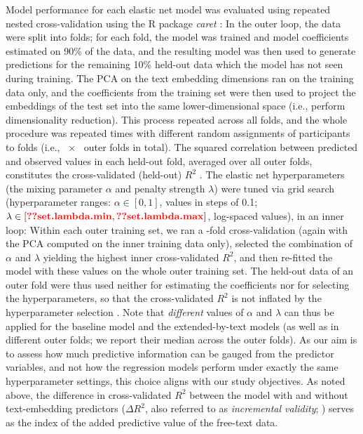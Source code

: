 \documentclass[man,floatsintext]{apa7}
\newcommand{\change}[1]{#1}
\begin{document}
Model performance for each elastic net model was evaluated using \change{repeated nested} cross-validation \change{using the R package \emph{caret} \parencite{caret}}: \change{In the outer loop, the data were split into \res{set.folds} folds;} for each fold, the model was trained and model coefficients estimated on 90\% of the data, and the resulting model was then used to generate  predictions for the remaining 10\% held-out data which the model has not seen during training. \change{The PCA on the text embedding dimensions ran on the training data only, and the coefficients from the training set were then used to project the embeddings of the test set into the same lower-dimensional space (i.e., perform dimensionality reduction).} This process repeated across all folds\change{, and the whole procedure was repeated  times with different random assignments of participants to folds (i.e., \res{set.repeats}~$\times$~\res{set.folds} outer folds in total)}. The  \change{squared correlation between predicted and observed values in each held-out fold, averaged over all outer folds,} constitutes the cross-validated (\change{held-out}) $R^2$ \change{\parencite{caret}}. The elastic net hyperparameters (the mixing parameter $\alpha$ and penalty strength $\lambda$) were tuned via grid search (hyperparameter ranges: $\alpha \in [0, 1]$, \change{ values in steps of 0.1}; $\lambda \in [\res{set.lambda.min}, \res{set.lambda.max}]$,  log-spaced values)\change{, in an inner loop: Within each outer training set, we ran a \res{set.innerfolds}-fold cross-validation (again with the PCA computed on the inner training data only), selected the combination of $\alpha$ and $\lambda$ yielding the highest inner cross-validated $R^2$, and then re-fitted the model with these values on the whole outer training set. The held-out data of an outer fold were thus used neither for estimating the coefficients nor for selecting the hyperparameters, so that the cross-validated $R^2$ is not inflated by the hyperparameter selection \parencite{varma2006bias}}. Note that  \emph{different} values of $\alpha$ and $\lambda$ can thus be applied for the baseline model and the extended-by-text models \change{(as well as in different outer folds; we report their median across the outer folds)}. As our aim is to assess how much predictive information can be gauged from the predictor variables, and not how the regression models perform under exactly the same hyperparameter settings, this choice aligns with our study objectives. As noted above, the difference in cross-validated $R^2$ between the model with and without text-embedding predictors ($\Delta R^2$, also referred to as \emph{incremental validity}; \cite{hunsley2003incremental, sechrest1963incremental} ) serves as the index of the added predictive value of the free-text data.
\end{document}
